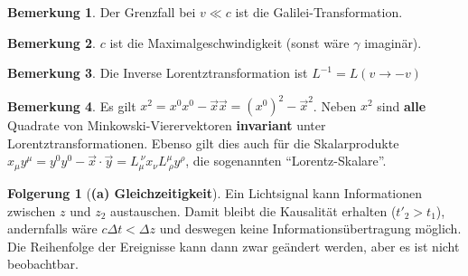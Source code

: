 \documentclass[oneside]{book}
\theoremstyle{definition}
\newtheorem*{bemerkung*}{Bemerkung}
\newtheorem*{folgerung*}{Folgerung}
\begin{document}
\begin{bemerkung*}
	Der Grenzfall bei $v \ll c$ ist die Galilei-Transformation.
\end{bemerkung*}
\begin{bemerkung*}
	$c$ ist die Maximalgeschwindigkeit (sonst wäre $\gamma$ imaginär).
\end{bemerkung*}
\begin{bemerkung*}
	Die Inverse Lorentztransformation ist $L^{-1} = L(v \to -v)$
\end{bemerkung*}
\begin{bemerkung*} Es gilt $x^2 = x^0 x^0 - \vec{x} \vec{x} = (x^0)^2 - \vec{x}^2$. Neben $x^2$ sind \textbf{alle} Quadrate von Minkowski-Vierervektoren \textbf{invariant} unter Lorentztransformationen. Ebenso gilt dies auch für die Skalarprodukte $x_\mu y^\mu = y^0 y^0 - \vec{x}\cdot\vec{y} = L_{\mu}^{~\nu} x_\nu  L^{\mu}_{~\rho}y^\rho$, die sogenannten "`Lorentz-Skalare"'.
\end{bemerkung*}

\begin{folgerung*}[\textbf{(a) Gleichzeitigkeit}]
	Ein Lichtsignal kann Informationen zwischen $z$ und $z_2$ austauschen. Damit bleibt die Kausalität erhalten ($t'_2 > t_1$), andernfalls wäre $c \Delta t < \Delta z$ und deswegen keine Informationsübertragung möglich. Die Reihenfolge der Ereignisse kann dann zwar geändert werden, aber es ist nicht beobachtbar.
\end{folgerung*}
\end{document}
